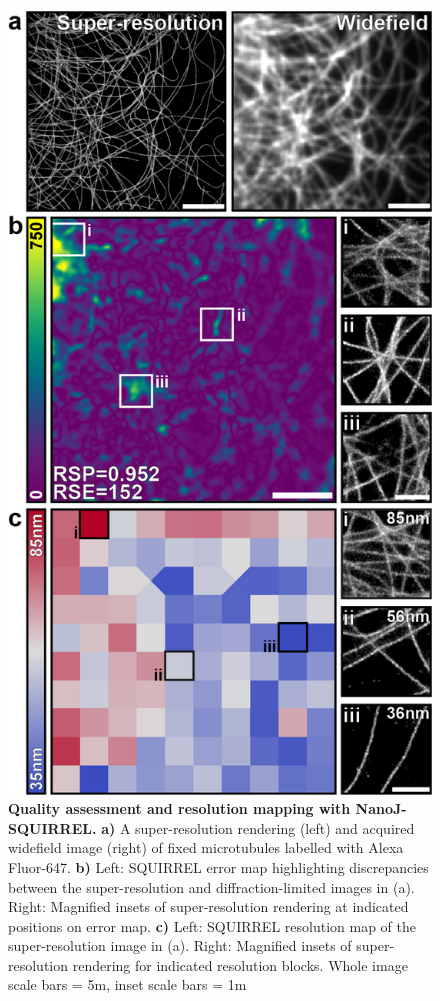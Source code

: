  \begin{figure}[!t]
    \centering
    \includegraphics{Figures/FigureSQUIRREL_v3.png}
    \caption{\textbf{Quality assessment and resolution mapping with NanoJ-SQUIRREL.} \textbf{a)} A super-resolution rendering (left) and acquired widefield image (right) of fixed microtubules labelled with Alexa Fluor-647. \textbf{b)} Left: SQUIRREL error map highlighting discrepancies between the super-resolution and diffraction-limited images in (a). Right: Magnified insets of super-resolution rendering at indicated positions on error map. \textbf{c)} Left: SQUIRREL resolution map of the super-resolution image in (a). Right: Magnified insets of super-resolution rendering for indicated resolution blocks. Whole image scale bars = 5\micro m, inset scale bars = 1\micro m}
    \label{fig:SQUIRREL}
 \end{figure}


